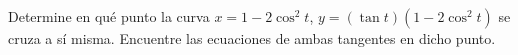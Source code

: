 \item Determine en qué punto la curva $x = 1 - 2\cos^2 t$, $y = (\tan t)(1 - 2\cos^2 t)$ se cruza a sí misma. Encuentre las ecuaciones de ambas tangentes en dicho punto.
